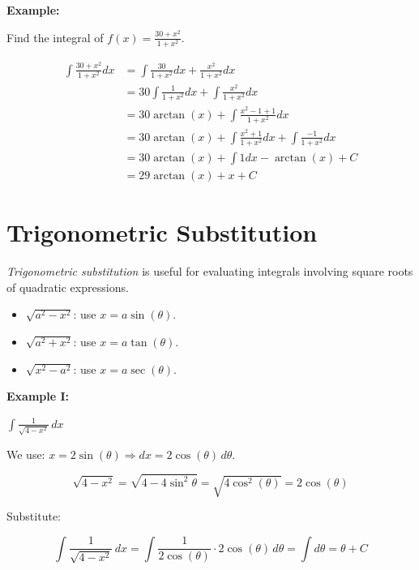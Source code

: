 \textbf{Example:}

Find the integral of \(f(x) = \frac{30 + x^2}{1 + x^2}\).

\begin{align*}
    \int \frac{30 + x^2}{1 + x^2} dx &= \int \frac{30}{1 + x^2} dx + \frac{x^2}{1 + x^2} dx \\ 
                                     &= 30\int \frac{1}{1 + x^2} dx + \int \frac{x^2}{1 + x^2} dx \\
                                     &= 30 \arctan(x) + \int \frac{x^2 - 1 + 1}{1 + x^2} dx \\
                                     &= 30 \arctan(x) + \int \frac{x^2 + 1}{1 + x^2} dx + \int \frac{-1}{1 + x^2} dx \\ 
                                     &= 30 \arctan(x) + \int 1 dx - \arctan(x) + C \\ 
                                     &= 29 \arctan(x) + x + C
\end{align*}

\section{Trigonometric Substitution}

\emph{Trigonometric substitution} is useful for evaluating integrals involving square roots of quadratic 
expressions.

\begin{itemize}

    \item \(\sqrt{a^2 - x^2}\): use \(x = a \sin(\theta)\).

    \item \(\sqrt{a^2 + x^2}\): use \(x = a \tan(\theta)\).

    \item \(\sqrt{x^2 - a^2}\): use \(x = a \sec(\theta)\).

\end{itemize}

\textbf{Example I:}

\( \int \frac{1}{\sqrt{4 - x^2}} \,dx \)

We use: \( x = 2\sin(\theta) \Rightarrow dx = 2\cos(\theta)\, d\theta \).

\[
    \sqrt{4 - x^2} = \sqrt{4 - 4\sin^2 \theta} = \sqrt{4\cos^2(\theta)} = 2\cos(\theta)
\]

Substitute:

\[
    \int \frac{1}{\sqrt{4 - x^2}} \,dx = \int \frac{1}{2\cos(\theta)} \cdot 2\cos(\theta) \,d\theta = 
    \int d\theta = \theta + C
\]

